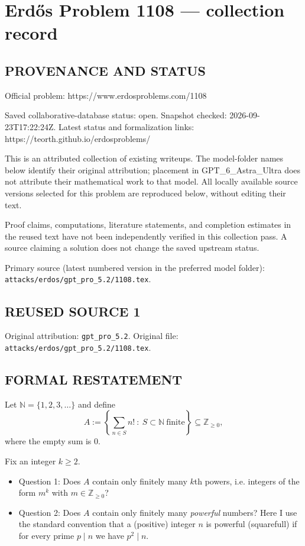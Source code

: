 \section*{Erd\H{o}s Problem 1108 --- collection record}

\subsection*{PROVENANCE AND STATUS}
Official problem: https://www.erdosproblems.com/1108

Saved collaborative-database status: open.
Snapshot checked: 2026-09-23T17:22:24Z.
Latest status and formalization links: https://teorth.github.io/erdosproblems/

This is an attributed collection of existing writeups. The model-folder names below identify their original attribution; placement in GPT\_6\_Astra\_Ultra does not attribute their mathematical work to that model. All locally available source versions selected for this problem are reproduced below, without editing their text.

Proof claims, computations, literature statements, and completion estimates in the reused text have not been independently verified in this collection pass. A source claiming a solution does not change the saved upstream status.

Primary source (latest numbered version in the preferred model folder): \texttt{attacks/erdos/gpt\_pro\_5.2/1108.tex}.

\subsection*{REUSED SOURCE 1}
Original attribution: \texttt{gpt\_pro\_5.2}.
Original file: \texttt{attacks/erdos/gpt\_pro\_5.2/1108.tex}.


\subsection*{FORMAL RESTATEMENT}
Let $\mathbb{N}=\{1,2,3,\dots\}$ and define
\[A := \left\{ \sum_{n\in S} n! \ :\  S\subset \mathbb{N}\ \text{finite}\right\} \subseteq \mathbb{Z}_{\ge 0},\]
where the empty sum is $0$.

Fix an integer $k\ge 2$.
\begin{itemize}
\item Question 1: Does $A$ contain only finitely many $k$th powers, i.e. integers of the form $m^k$ with $m\in\mathbb{Z}_{\ge 0}$?
\item Question 2: Does $A$ contain only finitely many \emph{powerful} numbers?
Here I use the standard convention that a (positive) integer $n$ is powerful (squarefull) if for every prime $p\mid n$ we have $p^2\mid n$.
\end{itemize}


